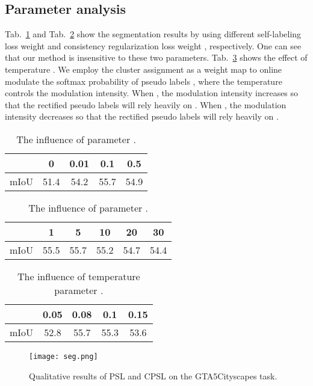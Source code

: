 \documentclass[10pt,twocolumn,letterpaper]{article}
\begin{document}
	\subsection{Parameter analysis}
	Tab.~\ref{tab1} and Tab.~\ref{tab2} show the segmentation results by using different self-labeling loss weight  and consistency regularization loss weight , respectively. One can see that our method is insensitive to these two parameters. Tab.~\ref{tab3} shows the effect of temperature . We employ the cluster assignment  as a weight map to online modulate the softmax probability of pseudo labels , where the temperature  controls the modulation intensity. When , the modulation intensity increases so that the rectified pseudo labels  will rely heavily on . When , the modulation intensity decreases so that the rectified pseudo labels  will rely heavily on .
	\begin{table}[!h]
		\centering
		\begin{tabular}{ccccc}
			\hline
			 & 0    & 0.01 & 0.1  & 0.5  \\ \hline
			mIoU                      & 51.4 & 54.2 & 55.7 & 54.9 \\ \hline
		\end{tabular}
		\caption{The influence of parameter .}
		\label{tab1}
	\end{table}
	
	\begin{table}[!h]
		\centering
		\begin{tabular}{cccccc}
			\hline
			 & 1    & 5    & 10   & 20   & 30   \\ \hline
			mIoU       & 55.5 & 55.7 & 55.2 & 54.7 & 54.4 \\ \hline
		\end{tabular}
		\caption{The influence of parameter .}
		\label{tab2}
	\end{table}
	
	
	\begin{table}[!h]
		\centering
		\begin{tabular}{ccccc}
			\hline
			 &0.05 & 0.08 & 0.1  & 0.15 \\ \hline
			mIoU   & 52.8 & 55.7 & 55.3 & 53.6 \\ \hline
		\end{tabular}
		\caption{The influence of temperature parameter .}
		\label{tab3}\vspace{-1.0em}
	\end{table}
	
	\begin{figure*}
		\hspace{-1.5em} \vspace{-2.0em}
		\centering 
		\texttt{[image: seg.png]}\\
		\caption{Qualitative results of PSL and CPSL on the GTA5Cityscapes task.}
		\label{fig1}\vspace{-2.0em}
	\end{figure*}
	
\end{document}
